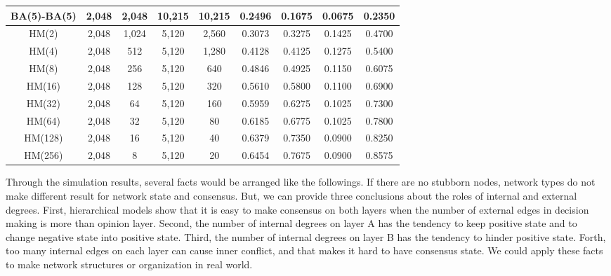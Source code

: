 \begin{table}[!htb]
\begin{center}
\begin{tabular}{c|c|c|c|c|c|c|c|c}
			BA(5)-BA(5)            & 2,048 	& 2,048   & 10,215  & 10,215  &  0.2496   & 0.1675 & 0.0675 & 0.2350   \\ \hline
			HM(2)  				   & 2,048 	& 1,024   & 5,120   & 2,560   &  0.3073   & 0.3275 & 0.1425 & 0.4700   \\ \hline    
			HM(4) 				   & 2,048 	&  512    & 5,120   & 1,280   &  0.4128   & 0.4125 & 0.1275 & 0.5400   \\ \hline
			HM(8)  				   & 2,048 	&  256    & 5,120   & 640     &  0.4846   & 0.4925 & 0.1150 & 0.6075   \\ \hline
			HM(16)				   & 2,048 	&  128    & 5,120   & 320     &  0.5610   & 0.5800 & 0.1100 & 0.6900   \\ \hline
			HM(32) 				   & 2,048 	&   64    & 5,120   & 160     &  0.5959   & 0.6275 & 0.1025 & 0.7300   \\ \hline
			HM(64) 				   & 2,048 	&   32    & 5,120   & 80      &  0.6185   & 0.6775 & 0.1025 & 0.7800   \\ \hline 
			HM(128) 			   & 2,048 	&   16    & 5,120   & 40      &  0.6379   & 0.7350 & 0.0900 & 0.8250   \\ \hline 
			HM(256) 			   & 2,048 	&    8    & 5,120   & 20      &  0.6454   & 0.7675 & 0.0900 & 0.8575   \\ \hline 
			 \hline
		\end{tabular}
	\end{center}
\end{table} 
Through the simulation results, several facts would be arranged like the followings. If there are no stubborn nodes, network types do not make different result for network state and consensus. But, we can provide three conclusions about the roles of internal and external degrees. First, hierarchical models show that it is easy to make consensus on both layers when the number of external edges in decision making is more than opinion layer. Second, the number of internal degrees on layer A has the tendency to keep positive state and to change negative state into positive state. Third,  the number of internal degrees on layer B has the tendency to hinder positive state. Forth, too many internal edges on each layer can cause inner conflict, and that makes it hard to have consensus state. We could apply these facts to make network structures or organization in real world. 